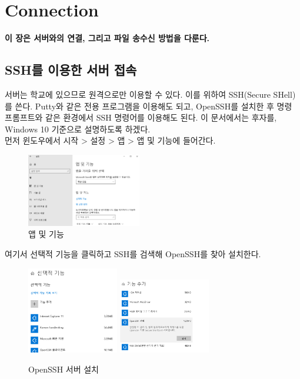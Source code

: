 
\graphicspath{{./chap2/images/}}
\chapter{Connection}
  
\textbf{이 장은 서버와의 연결, 그리고 파일 송수신 방법을 다룬다.}

\section{SSH를 이용한 서버 접속}
	서버는 학교에 있으므로 원격으로만 이용할 수 있다. 이를 위하여 SSH(Secure SHell)를 쓴다. Putty와 같은 전용 프로그램을 이용해도 되고, OpenSSH를 설치한 후 명령 프롬프트와 같은 환경에서 SSH 명령어를 이용해도 된다. 이 문서에서는 후자를, Windows 10 기준으로 설명하도록 하겠다.\\
	
	먼저 윈도우에서 시작 > 설정 > 앱 > 앱 및 기능에 들어간다.
	\begin{figure}[h]
	\begin{center}
        \includegraphics[width=5cm]{ssh1.png}
        \caption{앱 및 기능}
    \end{center}
    \end{figure}
	
	여기서 선택적 기능을 클릭하고 SSH를 검색해 OpenSSH를 찾아 설치한다.
	
	\begin{figure}[H]
	\begin{center}
        \includegraphics[width=4cm]{ssh2.png}
        \includegraphics[width=4cm]{ssh3.png}
        \caption{OpenSSH 서버 설치}
    \end{center}
    \end{figure}
    
